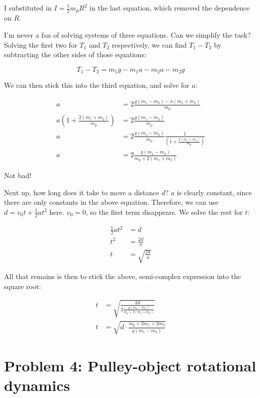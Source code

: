 \documentclass[12pt,a4paper]{report}
\begin{document}
I substituted in $\displaystyle I = \frac{1}{2} m_p R^2$ in the last equation, which removed the dependence on $R$.

I'm never a fan of solving systems of three equations. Can we simplify the task? Solving the first two for $T_1$ and $T_2$ respectively, we can find $T_1 - T_2$ by subtracting the other sides of those equations:

\begin{equation}
T_1 - T_2 = m_1 g - m_1 a - m_2 a - m_2 g
\end{equation}

We can then stick this into the third equation, and solve for $a$:

\begin{align}
a &= 2 \frac{g(m_1 - m_2) - a (m_1 + m_2)}{m_p}\\
a \left(1 + \frac{2 (m_1 + m_2)}{m_p}\right) &= 2 \frac{g(m_1 - m_2)}{m_p}\\
a &= 2 \frac{g(m_1 - m_2)}{m_p} \frac{1}{\left(1 + \frac{2 (m_1 + m_2)}{m_p}\right)}\\
a &= 2 \frac{g(m_1 - m_2)}{m_p + 2 (m_1 + m_2)} 
\end{align}

Not bad!

Next up, how long does it take to move a distance $d$? $a$ is clearly constant, since there are only constants in the above equation. Therefore, we can use $\displaystyle d = v_0 t + \frac{1}{2} a t^2$ here. $v_0 = 0$, so the first term disappears. We solve the rest for $t$:

\begin{align}
\frac{1}{2} a t^2 &= d\\
t^2 &= \frac{2 d}{a}\\
t &= \sqrt{\frac{2 d}{a}}
\end{align}

All that remains is then to stick the above, semi-complex expression into the square root:

\begin{align}
t &= \sqrt{\frac{2 d}{2 \frac{g(m_1 - m_2)}{m_p + 2 (m_1 + m_2)}}}\\
t &= \sqrt{d \cdot \frac{m_p + 2 m_1 + 2 m_2}{g(m_1 - m_2)}}
\end{align}

\section{Problem 4: Pulley-object rotational dynamics}
\end{document}
